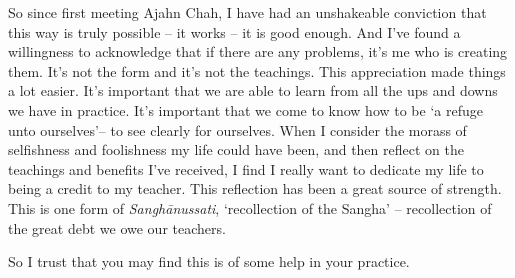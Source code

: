 So since first meeting Ajahn Chah, I have had an unshakeable conviction
that this way is truly possible -- it works -- it is good enough. And
I've found a willingness to acknowledge that if there are any problems, 
it's me who is creating them. It's not the form and it's not the
teachings. This appreciation made things a lot easier. It's important
that we are able to learn from all the ups and downs we have in
practice. It's important that we come to know how to be `a refuge unto
ourselves'-- to see clearly for ourselves. When I consider the morass of
selfishness and foolishness my life could have been, and then reflect on
the teachings and benefits I've received, I find I really want to
dedicate my life to being a credit to my teacher. This reflection has
been a great source of strength. This is one form of
\emph{Sanghānussati}, `recollection of the Sangha' -- recollection of
the great debt we owe our teachers. 

So I trust that you may find this is of some help in your practice.


